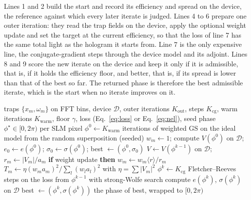 Lines 1 and 2 build the start and record its efficiency and spread on the device, the reference against which every later iterate is judged. Lines 4 to 6 prepare one outer iteration: they read the trap fields on the device, apply the optional weight update and set the target at the current efficiency, so that the loss of line 7 has the same total light as the hologram it starts from. Line 7 is the only expensive line, the conjugate-gradient steps through the device model and its adjoint. Lines 8 and 9 score the new iterate on the device and keep it only if it is admissible, that is, if it holds the efficiency floor, and better, that is, if its spread is lower than that of the best so far. The returned phase is therefore the best admissible iterate, which is the start when no iterate improves on it.

\begin{algorithm}[t]
\caption{Device-aware conjugate-gradient refinement. The device model $\mathcal D$ is the composition of replication, blur, FFT on the fine grid, crop and pixel envelope; $\mathcal D=\mathrm{id}$ gives the ideal model. The weight update (line 5) runs only when the option is on.}
\label{alg:b1}
\begin{algorithmic}[1]
\Require traps $\{x_m,\omega_m\}$ on FFT bins, device $\mathcal D$, outer iterations $K_{\mathrm{out}}$, steps $K_{\mathrm{cg}}$, warm iterations $K_{\mathrm{warm}}$, floor $\gamma$, loss (Eq.~\ref{eq:loss} or Eq.~\ref{eq:nel}), seed
\Ensure phase $\phi^\star\in[0,2\pi)$ per SLM pixel
\State $\phi^0\gets K_{\mathrm{warm}}$ iterations of weighted GS on the ideal model from the random superposition (seeded)
\State $w_m\gets1$; compute $V(\phi^0)$ on $\mathcal D$; $e_0\gets e(\phi^0)$; $\sigma_0\gets\sigma(\phi^0)$; best $\gets(\phi^0,\sigma_0)$
  \State $V\gets V(\phi^{k-1})$ on $\mathcal D$; $r_m\gets|V_m|/a_m$
  \State \textbf{if} weight update \textbf{then} $w_m\gets w_m\langle r\rangle/r_m$ 
  \State $T_m\gets\eta(w_ma_m)^2/\sum_l(w_la_l)^2$ with $\eta=\sum|V_m|^2$ 
  \State $\phi^k\gets K_{\mathrm{cg}}$ Fletcher--Reeves steps on the loss from $\phi^{k-1}$ with strong-Wolfe search 
  \State compute $e(\phi^k)$, $\sigma(\phi^k)$ on $\mathcal D$
   best $\gets(\phi^k,\sigma(\phi^k))$ \EndIf
\EndFor
\State \Return the phase of best, wrapped to $[0,2\pi)$ 
\end{algorithmic}
\end{algorithm}

